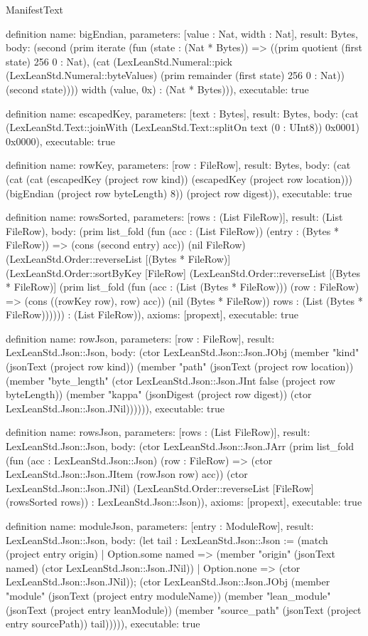 \begin{lexlean}{ManifestText}
\begin{semanticmodule}
definition{
  name: bigEndian,
  parameters: [value : Nat, width : Nat],
  result: Bytes,
  body: (second (prim iterate (fun (state : (Nat * Bytes)) => ((prim quotient (first state) 256 0 : Nat), (cat (LexLeanStd.Numeral::pick (LexLeanStd.Numeral::byteValues) (prim remainder (first state) 256 0 : Nat)) (second state)))) width (value, 0x) : (Nat * Bytes))),
  executable: true
}

definition{
  name: escapedKey,
  parameters: [text : Bytes],
  result: Bytes,
  body: (cat (LexLeanStd.Text::joinWith (LexLeanStd.Text::splitOn text (0 : UInt8)) 0x0001) 0x0000),
  executable: true
}

definition{
  name: rowKey,
  parameters: [row : FileRow],
  result: Bytes,
  body: (cat (cat (cat (escapedKey (project row kind)) (escapedKey (project row location))) (bigEndian (project row byteLength) 8)) (project row digest)),
  executable: true
}

definition{
  name: rowsSorted,
  parameters: [rows : (List FileRow)],
  result: (List FileRow),
  body: (prim list_fold (fun (acc : (List FileRow)) (entry : (Bytes * FileRow)) => (cons (second entry) acc)) (nil FileRow) (LexLeanStd.Order::reverseList [(Bytes * FileRow)] (LexLeanStd.Order::sortByKey [FileRow] (LexLeanStd.Order::reverseList [(Bytes * FileRow)] (prim list_fold (fun (acc : (List (Bytes * FileRow))) (row : FileRow) => (cons ((rowKey row), row) acc)) (nil (Bytes * FileRow)) rows : (List (Bytes * FileRow)))))) : (List FileRow)),
  axioms: [propext],
  executable: true
}

definition{
  name: rowJson,
  parameters: [row : FileRow],
  result: LexLeanStd.Json::Json,
  body: (ctor LexLeanStd.Json::Json.JObj (member "kind" (jsonText (project row kind)) (member "path" (jsonText (project row location)) (member "byte_length" (ctor LexLeanStd.Json::Json.JInt false (project row byteLength)) (member "kappa" (jsonDigest (project row digest)) (ctor LexLeanStd.Json::Json.JNil)))))),
  executable: true
}

definition{
  name: rowsJson,
  parameters: [rows : (List FileRow)],
  result: LexLeanStd.Json::Json,
  body: (ctor LexLeanStd.Json::Json.JArr (prim list_fold (fun (acc : LexLeanStd.Json::Json) (row : FileRow) => (ctor LexLeanStd.Json::Json.JItem (rowJson row) acc)) (ctor LexLeanStd.Json::Json.JNil) (LexLeanStd.Order::reverseList [FileRow] (rowsSorted rows)) : LexLeanStd.Json::Json)),
  axioms: [propext],
  executable: true
}

definition{
  name: moduleJson,
  parameters: [entry : ModuleRow],
  result: LexLeanStd.Json::Json,
  body: (let tail : LexLeanStd.Json::Json := (match (project entry origin)
    | Option.some named => (member "origin" (jsonText named) (ctor LexLeanStd.Json::Json.JNil))
    | Option.none => (ctor LexLeanStd.Json::Json.JNil)); (ctor LexLeanStd.Json::Json.JObj (member "module" (jsonText (project entry moduleName)) (member "lean_module" (jsonText (project entry leanModule)) (member "source_path" (jsonText (project entry sourcePath)) tail))))),
  executable: true
}


\end{semanticmodule}
\end{lexlean}
